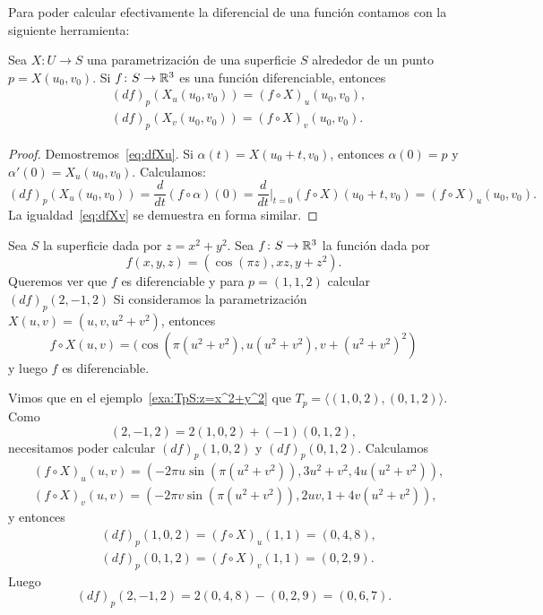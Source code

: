 Para poder calcular efectivamente la diferencial de una función contamos con la
siguiente herramienta:

\begin{lemma}
	Sea $X\colon U\to S$ una parametrización de una superficie $S$ alrededor de un punto $p=X(u_0,v_0)$. 
	Si $f\colon S\to\mathbb{R}^3$ es una función diferenciable, entonces
	\begin{align}
		\label{eq:dfXu}&(df)_p(X_u(u_0,v_0))=(f\circ X)_u(u_0,v_0),\\
		\label{eq:dfXv}&(df)_p(X_v(u_0,v_0))=(f\circ X)_v(u_0,v_0).
	\end{align}
\end{lemma}

\begin{proof}
	Demostremos~\eqref{eq:dfXu}. Si $\alpha(t)=X(u_0+t,v_0)$, entonces
	$\alpha(0)=p$ y $\alpha'(0)=X_u(u_0,v_0)$. Calculamos:
	\[
		(df)_p(X_u(u_0,v_0))=\frac{d}{dt}(f\circ\alpha)(0)=\frac{d}{dt}\bigg|_{t=0}(f\circ X)(u_0+t,v_0)=(f\circ X)_u(u_0,v_0).
	\]
	La igualdad~\eqref{eq:dfXv} se demuestra en forma similar.
\end{proof}

\begin{example}
	Sea $S$ la superficie dada por $z=x^2+y^2$. Sea $f\colon S\to\mathbb{R}^3$ la
	función dada por
	\[
		f(x,y,z)=(\cos(\pi z),xz,y+z^2).
	\]
	Queremos ver que $f$ es diferenciable y para $p=(1,1,2)$ calcular $(df)_p(2,-1,2)$ Si
	consideramos la parametrización $X(u,v)=(u,v,u^2+v^2)$, entonces
	\[
		f\circ X(u,v)=(\cos (\pi(u^2+v^2),u(u^2+v^2),v+(u^2+v^2)^2)
	\]
	y luego $f$ es diferenciable. 

	Vimos que en el ejemplo~\ref{exa:TpS:z=x^2+y^2} que
	$T_p=\langle (1,0,2),(0,1,2)\rangle$. Como 
	\[
		(2,-1,2)=2(1,0,2)+(-1)(0,1,2),
	\]
	necesitamos
	poder calcular $(df)_p(1,0,2)$ y $(df)_p(0,1,2)$. 
	Calculamos
	\begin{align*}
	 &(f\circ X)_u(u,v)=(-2\pi u\sin(\pi(u^2+v^2)),3u^2+v^2,4u(u^2+v^2)),\\
	 &(f\circ X)_v(u,v)=(-2\pi v\sin(\pi(u^2+v^2)),2uv,1+4v(u^2+v^2)),
	\end{align*}
	y entonces 
	\begin{align*}
		&(df)_p(1,0,2)=(f\circ X)_u(1,1)=(0,4,8),\\
		&(df)_p(0,1,2)=(f\circ X)_v(1,1)=(0,2,9).
	\end{align*}
	Luego 
	\[
		(df)_p(2,-1,2)=2(0,4,8)-(0,2,9)=(0,6,7). 
	\]
\end{example}


